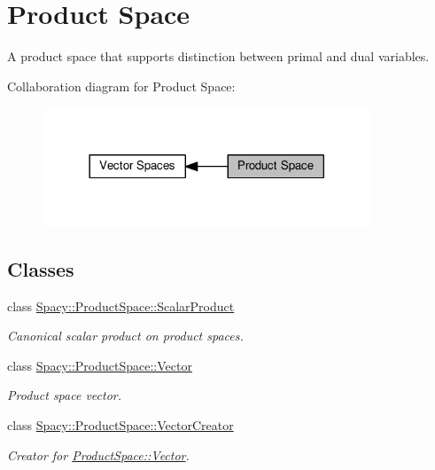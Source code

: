 \hypertarget{group__ProductSpaceGroup}{}\section{Product Space}
\label{group__ProductSpaceGroup}


A product space that supports distinction between primal and dual variables.  


Collaboration diagram for Product Space\+:\nopagebreak
\begin{figure}[H]
\begin{center}
\leavevmode
\includegraphics[width=278pt]{group__ProductSpaceGroup}
\end{center}
\end{figure}
\subsection*{Classes}
\begin{DoxyCompactItemize}
\item 
class \hyperlink{classSpacy_1_1ProductSpace_1_1ScalarProduct}{Spacy\+::\+Product\+Space\+::\+Scalar\+Product}
\begin{DoxyCompactList}\small\item\em Canonical scalar product on product spaces. \end{DoxyCompactList}\item 
class \hyperlink{classSpacy_1_1ProductSpace_1_1Vector}{Spacy\+::\+Product\+Space\+::\+Vector}
\begin{DoxyCompactList}\small\item\em Product space vector. \end{DoxyCompactList}\item 
class \hyperlink{classSpacy_1_1ProductSpace_1_1VectorCreator}{Spacy\+::\+Product\+Space\+::\+Vector\+Creator}
\begin{DoxyCompactList}\small\item\em Creator for \hyperlink{classSpacy_1_1ProductSpace_1_1Vector}{Product\+Space\+::\+Vector}. \end{DoxyCompactList}\end{DoxyCompactItemize}
